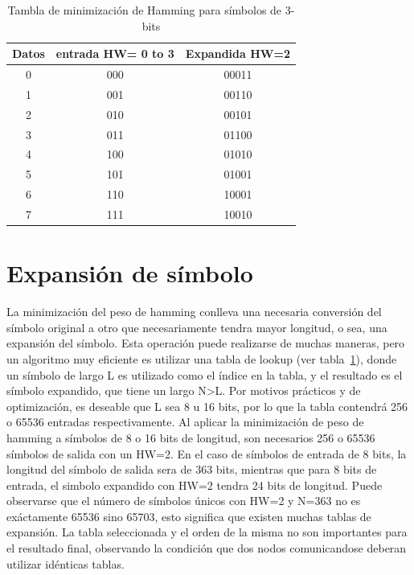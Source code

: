 \begin{table}[t]
\begin{center}
\begin{tabular}{c c c}
Datos & entrada HW= 0 to 3 & Expandida HW=2\\
\hline\hline
0 & 000 & 00011\\
1 & 001 & 00110\\
2 & 010 & 00101\\
3 & 011 & 01100\\
4 & 100 & 01010\\
5 & 101 & 01001\\
6 & 110 & 10001\\
7 & 111 & 10010\\
\end{tabular}
\caption{Tambla de minimización de Hamming para símbolos de 3-bits}
\label{hwtable}
\end{center}
 \end{table}
 
\section{Expansión de símbolo}
La minimización del peso de hamming conlleva una necesaria conversión del símbolo original a otro que necesariamente tendra mayor longitud, o sea, una expansión del símbolo.
Esta operación puede realizarse de muchas maneras, pero un algoritmo muy eficiente es utilizar una tabla de lookup (ver tabla~\ref{hwtable}), donde un símbolo de largo L es utilizado como el índice en la tabla, y el resultado es el símbolo expandido, que tiene un largo N\textgreater L.
Por motivos prácticos y de optimización, es deseable que L sea 8 u 16 bits, por lo que la tabla contendrá 256 o 65536 entradas respectivamente.
Al aplicar la minimización de peso de hamming a símbolos de 8 o 16 bits de longitud, son necesarios 256 o 65536 símbolos de salida con un HW=2. En el caso de símbolos de entrada de 8 bits, la longitud del símbolo de salida sera de 363 bits, mientras que para 8 bits de entrada, el simbolo expandido con HW=2 tendra 24 bits de longitud.
Puede observarse que el número de símbolos únicos con HW=2 y N=363 no es exáctamente 65536 sino 65703, esto significa que existen muchas tablas de expansión.
La tabla seleccionada y el orden de la misma no son importantes para el resultado final, observando la condición que dos nodos comunicandose deberan utilizar idénticas tablas.


